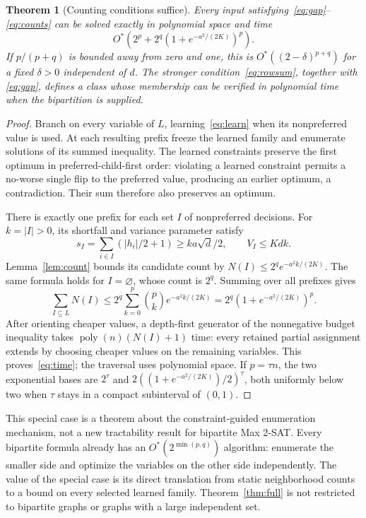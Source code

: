 \documentclass[11pt,a4paper]{article}
\newtheorem{theorem}{Theorem}
\newcommand{\Ostar}{O^{*}}
\begin{document}
\begin{theorem}[Counting conditions suffice]\label{thm:det}
Every input satisfying~\eqref{eq:gap}--\eqref{eq:counts} can be solved
exactly in polynomial space and time
\begin{equation}
 \Ostar\left(2^p+2^q(1+e^{-a^2/(2K)})^p\right).     \label{eq:time}
\end{equation}
If $p/(p+q)$ is bounded away from zero and one, this is
$\Ostar((2-\delta)^{p+q})$ for a fixed $\delta>0$ independent of $d$.
The stronger condition~\eqref{eq:rowsum}, together with
\eqref{eq:gap}, defines a class whose membership can be verified in
polynomial time when the bipartition is supplied.
\end{theorem}
\begin{proof}
Branch on every variable of $L$, learning~\eqref{eq:learn} when its
nonpreferred value is used. At each resulting prefix freeze the learned
family and enumerate solutions of its summed inequality. The learned
constraints preserve the first optimum in preferred-child-first order:
violating a learned constraint permits a no-worse single flip to the
preferred value, producing an earlier optimum, a contradiction.
Their sum therefore also preserves an optimum.

There is exactly one prefix for each set $I$ of nonpreferred decisions.
For $k=|I|>0$, its shortfall and variance parameter satisfy
\[
 s_I=\sum_{i\in I}(|h_i|/2+1)\ge ka\sqrt d/2,
 \qquad V_I\le Kdk.
\]
Lemma~\ref{lem:count} bounds its candidate count by
$N(I)\le2^q e^{-a^2k/(2K)}$. The same formula holds for $I=\varnothing$,
whose count is $2^q$. Summing over all prefixes gives
\[
 \sum_{I\subseteq L}N(I)
 \le2^q\sum_{k=0}^p\binom pk e^{-a^2k/(2K)}
 =2^q(1+e^{-a^2/(2K)})^p.
\]
After orienting cheaper values, a depth-first generator of the
nonnegative budget inequality takes $\operatorname{poly}(n)(N(I)+1)$
time: every retained partial assignment extends by choosing cheaper
values on the remaining variables. This proves~\eqref{eq:time}; the
traversal uses polynomial space. If $p=\tau n$, the two exponential
bases are $2^\tau$ and
$2((1+e^{-a^2/(2K)})/2)^\tau$, both uniformly below two when $\tau$
stays in a compact subinterval of $(0,1)$.
\end{proof}

This special case is a theorem about the constraint-guided enumeration
mechanism, not a new tractability result for bipartite Max 2-SAT.
Every bipartite formula already has an $\Ostar(2^{\min(p,q)})$ algorithm:
enumerate the smaller side and optimize the variables on the other
side independently. The value of the special case is its direct
translation from static neighborhood counts to a bound on every
selected learned family. Theorem~\ref{thm:full} is not restricted to
bipartite graphs or graphs with a large independent set.
\end{document}

